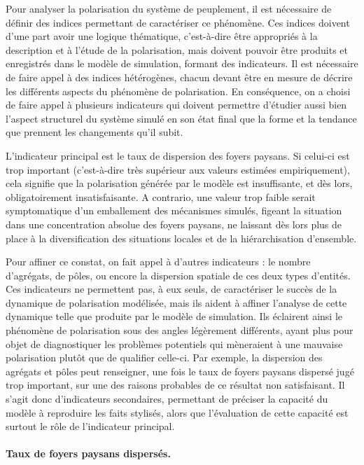 Pour analyser la polarisation du système de peuplement, il est nécessaire de définir des indices permettant de caractériser ce phénomène.
Ces indices doivent d'une part avoir une logique thématique, c'est-à-dire être appropriés à la description et à l'étude de la polarisation, mais doivent pouvoir être produits et enregistrés dans le modèle de simulation, formant des indicateurs.
Il est nécessaire de faire appel à des indices hétérogènes, chacun devant être en mesure de décrire les différents aspects du phénomène de polarisation.
En conséquence, on a choisi de faire appel à plusieurs indicateurs qui doivent permettre d'étudier aussi bien l'aspect structurel du système simulé en son état final que la forme et la tendance que prennent les changements qu'il subit.

L'indicateur principal est le taux de dispersion des foyers paysans.
Si celui-ci est trop important (c'est-à-dire très supérieur aux valeurs estimées empiriquement), cela signifie que la polarisation générée par le modèle est insuffisante, et dès lors, obligatoirement insatisfaisante.
A contrario, une valeur trop faible serait symptomatique d'un emballement des mécanismes simulés, figeant la situation dans une concentration absolue des foyers paysans, ne laissant dès lors plus de place à la diversification des situations locales et de la hiérarchisation d'ensemble.

Pour affiner ce constat, on fait appel à d'autres indicateurs :
le nombre d'agrégats, de pôles, ou encore la dispersion spatiale de ces deux types d'entités.
Ces indicateurs ne permettent pas, à eux seuls, de caractériser le succès de la dynamique de polarisation modélisée, mais ils aident à affiner l'analyse de cette dynamique telle que produite par le modèle de simulation.
Ils éclairent ainsi le phénomène de polarisation sous des angles légèrement différents, ayant plus pour objet de diagnostiquer les problèmes potentiels qui mèneraient à une mauvaise polarisation plutôt que de qualifier celle-ci.
Par exemple, la dispersion des agrégats et pôles peut renseigner, une fois le taux de foyers paysans dispersé jugé trop important, sur une des raisons probables de ce résultat non satisfaisant.
Il s'agit donc d'indicateurs secondaires, permettant de préciser la capacité du modèle à reproduire les faits stylisés, alors que l'évaluation de cette capacité est surtout le rôle de l'indicateur principal.


\paragraph{Taux de foyers paysans dispersés.}

